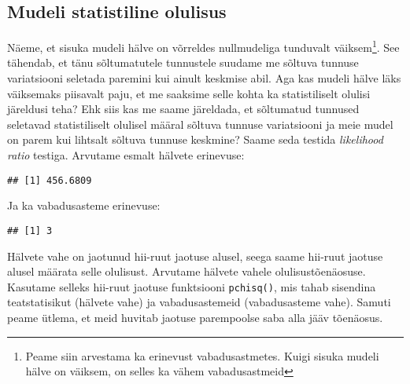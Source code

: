 \documentclass[
]{book}
\newenvironment{Shaded}{\begin{snugshade}}{\end{snugshade}}
\newcommand{\NormalTok}[1]{#1}
\newcommand{\OtherTok}[1]{\textcolor[rgb]{0.56,0.35,0.01}{#1}}
\newcommand{\SpecialCharTok}[1]{\textcolor[rgb]{0.00,0.00,0.00}{#1}}
\begin{document}
\hypertarget{mudeli-statistiline-olulisus}{%
\subsection{Mudeli statistiline olulisus}\label{mudeli-statistiline-olulisus}}

Näeme, et sisuka mudeli hälve on võrreldes nullmudeliga tunduvalt väiksem\footnote{Peame siin arvestama ka erinevust vabadusastmetes. Kuigi sisuka mudeli hälve on väiksem, on selles ka vähem vabadusastmeid}. See tähendab, et tänu sõltumatutele tunnustele suudame me sõltuva tunnuse variatsiooni seletada paremini kui ainult keskmise abil. Aga kas mudeli hälve läks väiksemaks piisavalt paju, et me saaksime selle kohta ka statistiliselt olulisi järeldusi teha? Ehk siis kas me saame järeldada, et sõltumatud tunnused seletavad statistiliselt olulisel määral sõltuva tunnuse variatsiooni ja meie mudel on parem kui lihtsalt sõltuva tunnuse keskmine? Saame seda testida \emph{likelihood ratio} testiga. Arvutame esmalt hälvete erinevuse:

\begin{Shaded}
\end{Shaded}

\begin{verbatim}
## [1] 456.6809
\end{verbatim}

Ja ka vabadusasteme erinevuse:

\begin{Shaded}
\end{Shaded}

\begin{verbatim}
## [1] 3
\end{verbatim}

Hälvete vahe on jaotunud hii-ruut jaotuse alusel, seega saame hii-ruut jaotuse alusel määrata selle olulisust. Arvutame hälvete vahele olulisustõenäosuse. Kasutame selleks hii-ruut jaotuse funktsiooni \texttt{pchisq()}, mis tahab sisendina teatstatisikut (hälvete vahe) ja vabadusastemeid (vabadusasteme vahe). Samuti peame ütlema, et meid huvitab jaotuse parempoolse saba alla jääv tõenäosus.
\end{document}
